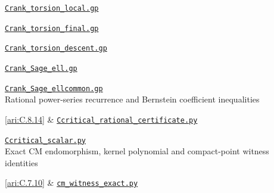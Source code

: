 \href{https://github.com/KokunoYumeto/s6-complex-structure-workbench/blob/\SsixRepositoryCommit/pro_returns/S6_10_PAPERS_checkpoint_15_20261119T1045Z/S6_10_PAPERS/code/I/replay_torsion/Crank_torsion_local.gp}{\nolinkurl{Crank_torsion_local.gp}}\par \href{https://github.com/KokunoYumeto/s6-complex-structure-workbench/blob/\SsixRepositoryCommit/pro_returns/S6_10_PAPERS_checkpoint_15_20261119T1045Z/S6_10_PAPERS/code/I/replay_torsion/Crank_torsion_final.gp}{\nolinkurl{Crank_torsion_final.gp}}\par \href{https://github.com/KokunoYumeto/s6-complex-structure-workbench/blob/\SsixRepositoryCommit/pro_returns/S6_10_PAPERS_checkpoint_15_20261119T1045Z/S6_10_PAPERS/code/I/replay_torsion/Crank_torsion_descent.gp}{\nolinkurl{Crank_torsion_descent.gp}}\par \href{https://github.com/KokunoYumeto/s6-complex-structure-workbench/blob/\SsixRepositoryCommit/pro_returns/S6_10_PAPERS_checkpoint_15_20261119T1045Z/S6_10_PAPERS/code/I/replay_torsion/Crank_Sage_ell.gp}{\nolinkurl{Crank_Sage_ell.gp}}\par \href{https://github.com/KokunoYumeto/s6-complex-structure-workbench/blob/\SsixRepositoryCommit/pro_returns/S6_10_PAPERS_checkpoint_15_20261119T1045Z/S6_10_PAPERS/code/I/replay_torsion/Crank_Sage_ellcommon.gp}{\nolinkurl{Crank_Sage_ellcommon.gp}} \\[3pt]
\hypertarget{prog:I:critical}{}Rational power-series recurrence and Bernstein coefficient inequalities\par \cref{ari:C.8.14} &
\href{https://github.com/KokunoYumeto/s6-complex-structure-workbench/blob/\SsixRepositoryCommit/pro_returns/S6_10_PAPERS_checkpoint_15_20261119T1045Z/S6_10_PAPERS/code/I/replay_arithmetic/Ccritical_rational_certificate.py}{\nolinkurl{Ccritical_rational_certificate.py}}\par \href{https://github.com/KokunoYumeto/s6-complex-structure-workbench/blob/\SsixRepositoryCommit/pro_returns/S6_10_PAPERS_checkpoint_15_20261119T1045Z/S6_10_PAPERS/code/I/replay_arithmetic/Ccritical_scalar.py}{\nolinkurl{Ccritical_scalar.py}} \\[3pt]
\hypertarget{prog:I:cm_witness}{}Exact CM endomorphism, kernel polynomial and compact-point witness identities\par \cref{ari:C.7.10} &
\href{https://github.com/KokunoYumeto/s6-complex-structure-workbench/blob/\SsixRepositoryCommit/pro_returns/S6_SERIES_GRIND_checkpoint_10_20261120T0211Z/code/current_audits/audit_paper_i/arithmetic_06/cm_witness_exact.py}{\nolinkurl{cm_witness_exact.py}} \\[3pt]
